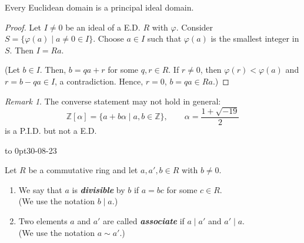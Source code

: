 \documentclass[twoside]{article}
\newcommand\Z{\mathbb Z}
\theoremstyle{remark}
\newtheorem*{remark}{{Remark}}
\newcounter{theorem}
\newcommand*\term[1]{\textbf{\textit{\mathversion{bold}#1}}}
\newcommand*\newclass[1]{\par\vbox to 0pt{\hbox{\tiny\sffamily\color{gray}#1}} \par\ignorespaces}
\begin{document}
\begin{theorem}
  Every Euclidean domain is a principal ideal domain.
\end{theorem}

\begin{proof}
  Let \(I \neq 0\) be an ideal of a E.D. \(R\) with \(\varphi\). Consider \(S = \{\varphi(a) \mid a \neq 0 \in I\}\). Choose \(a \in I\) such that \(\varphi(a)\) is the smallest integer in \(S\). Then \(I = Ra\). \par
  (Let \(b \in I\). Then, \(b = qa + r\) for some \(q,r \in R\). If \(r \neq 0\), then \(\varphi(r) < \varphi(a)\) and \(r = b-qa \in I\), a contradiction. Hence, \(r=0\), \(b = qa \in Ra\).)
\end{proof}

\begin{remark}
  The converse statement may not hold in general:
  \[ \Z[\alpha] = \{a + b\alpha \mid a,b \in \Z\}, \qquad \alpha = \frac{1+\sqrt{-19}}2 \]
  is a P.I.D. but not a E.D.
\end{remark}

\newclass{30-08-23}

\begin{definition} 
  Let \(R\) be a commutative ring and let \(a, a', b \in R\) with \(b \neq 0\).
  \begin{enumerate}[label=\arabic*.]
    \item We say that \(a\) is \term{divisible} by \(b\) if \(a=bc\) for some \(c \in R\). \\
    (We use the notation \(b \mid a\).)
    \item Two elements \(a\) and \(a'\) are called \term{associate} if \(a \mid a'\) and \(a' \mid a\). \\
    (We use the notation \(a \sim a'\).)
  \end{enumerate}
\end{definition}
\end{document}
